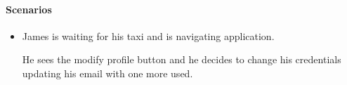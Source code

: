 \paragraph{Scenarios}
\begin{itemize}
	\item James is waiting for his taxi and is navigating \myTaxiService{} application. \par He sees the modify profile button and he decides to change his credentials updating his email with one more used.
\end{itemize}
